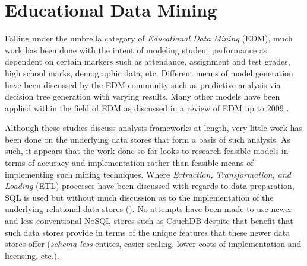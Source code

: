 \section{Educational Data Mining}
Falling under the umbrella category of \textit{Educational Data Mining} (EDM), much work has been done with the intent of modeling student performance as dependent on certain markers such as attendance, assignment and test grades, high school marks, demographic data, etc. Different means of model generation have been discussed by the EDM community such as predictive analysis via decision tree generation \cite{Qasem20016,Balestra2017,casper2017,Dimitris,zebun2005,Mierle:2005} with varying results. Many other models have been applied within the field of EDM as discussed in a review of EDM up to 2009 \cite{bakerEdMiningSummary}.

Although these studies discuss analysis-frameworks at length, very little work has been done on the underlying data stores that form a basis of such analysis. As such, it appears that the work done so far looks to research feasible models in terms of accuracy and implementation rather than feasible means of implementing such mining techniques. Where \textit{Extraction, Transformation, and Loading} (ETL) processes have been discussed with regards to data preparation, SQL is used but without much discussion as to the implementation of the underlying relational data stores (\cite{Balestra2017,casper2017,Mierle:2005}). No attempts have been made to use newer and less conventional NoSQL stores such as CouchDB despite that benefit that such data stores provide in terms of the unique features that these newer data stores offer (\textit{schema-less} entites, easier scaling, lower costs of implementation and licensing, etc.).